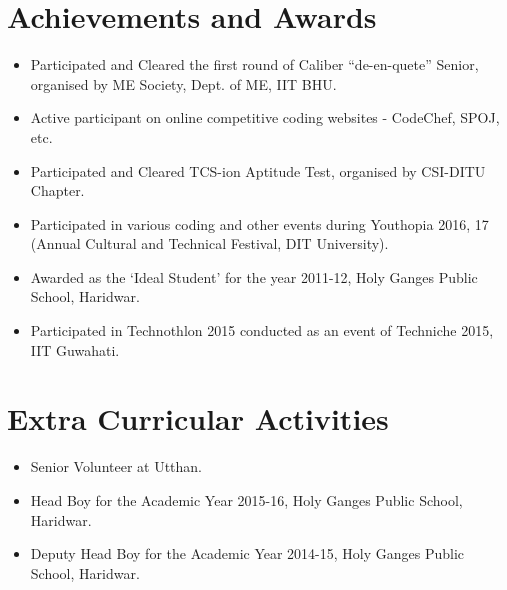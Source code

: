 \documentclass[a4paper, margin, centered]{res}
\begin{document}
\begin{resume}

\section{Achievements and Awards}
\begin{itemize}[leftmargin=*]
 


\item Participated and Cleared the first round of Caliber “de-en-quete” Senior, organised by ME Society, Dept. of ME, IIT BHU.
\item Active participant on online competitive coding websites - CodeChef, SPOJ, etc.
\item Participated and Cleared TCS-ion Aptitude Test, organised by CSI-DITU Chapter.
\item Participated in various coding and other events during Youthopia 2016, 17 (Annual Cultural and Technical Festival, DIT University).
\item Awarded as the ‘Ideal Student’ for the year 2011-12, Holy Ganges Public School, Haridwar.
\item Participated in Technothlon 2015 conducted as an event of Techniche 2015, IIT Guwahati.
\end{itemize}
\section{Extra Curricular Activities}
\begin{itemize}[leftmargin=*]

\item Senior Volunteer at Utthan.
\item Head Boy for the Academic Year  2015-16, Holy Ganges Public School, Haridwar.
\item Deputy Head Boy for the Academic Year  2014-15, Holy Ganges Public School, Haridwar.


\end{itemize}



\end{resume}
\end{document}
